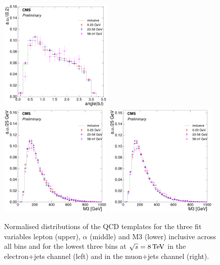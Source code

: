 \begin{figure}[hbtp]
     \includegraphics[width=0.48\textwidth]{Chapters/04_Analysis/04b_XSections/images/8TeV/fit_variables/muon/MT/angle_bl/qcd/MT_angle_bl_1orMoreBtag_QCD_template_comparison.pdf}\\
     \includegraphics[width=0.48\textwidth]{Chapters/04_Analysis/04b_XSections/images/8TeV/fit_variables/electron/MT/M3/qcd/MT_M3_0orMoreBtag_QCD_template_comparison.pdf}\hfill
     \includegraphics[width=0.48\textwidth]{Chapters/04_Analysis/04b_XSections/images/8TeV/fit_variables/muon/MT/M3/qcd/MT_M3_0orMoreBtag_QCD_template_comparison.pdf}\\
	 \caption[Normalised distributions of the QCD templates for the three fit variables in \mt bins
	 at $\sqrt{s}=8\TeV$.]{Normalised distributions of the QCD templates for the three fit variables lepton
	 \abseta (upper), $\alpha$ (middle) and M3 (lower) inclusive across all \mt bins and for the lowest three \mt
	 bins at $\sqrt{s}=8\TeV$ in the electron+jets channel (left) and in the muon+jets channel (right).}
     \label{fig:MT_fit_variable_qcd_comparisons_8TeV}
\end{figure}

